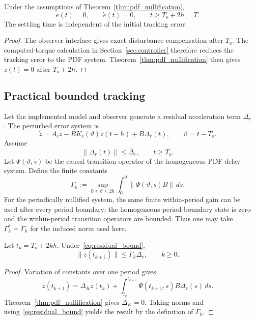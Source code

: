 \begin{theorem}\label{thm:main_ideal}
Under the assumptions of Theorem~\ref{thm:pdf_nullification},
\begin{equation}
 e(t)=0,\qquad \dot e(t)=0,
 \qquad t\geq T_o+2h=T.
\end{equation}
The settling time is independent of the initial tracking error.
\end{theorem}
\begin{proof}
The observer interface gives exact disturbance compensation after $T_o$.
The computed-torque calculation in Section~\ref{sec:controller} therefore
reduces the tracking error to the PDF system. Theorem~\ref{thm:pdf_nullification}
then gives $z(t)=0$ after $T_o+2h$.\end{proof}

\subsection{Practical bounded tracking}\label{sec:practical}
Let the implemented model and observer generate a residual acceleration
term $\Delta_r$. The perturbed error system is
\begin{equation}
 \dot z=A_cz-BK_c(\vartheta)z(t-h)+B\Delta_r(t),
 \qquad \vartheta=t-T_o.
 \label{eq:perturbed_delay_error}
\end{equation}
Assume
\begin{equation}
 \|\Delta_r(t)\|\leq\bar\Delta_r,
 \qquad t\geq T_o.
 \label{eq:residual_bound}
\end{equation}
Let $\Psi(\vartheta,s)$ be the causal transition operator of the homogeneous
PDF delay system. Define the finite constants
\begin{equation}
 \Gamma_h:=\sup_{0\leq\vartheta\leq2h}
 \int_0^\vartheta\|\Psi(\vartheta,s)B\|\,ds .
 \label{eq:gamma_definition}
\end{equation}
For the periodically nullified system, the same finite within-period gain can
be used after every period boundary: the homogeneous period-boundary state is
zero and the within-period transition operators are bounded. Thus one may take
$\Gamma_h^*=\Gamma_h$ for the induced norm used here.

\begin{theorem}\label{thm:practical_boundary}
Let $t_k=T_o+2kh$. Under~\eqref{eq:residual_bound},
\begin{equation}
 \|z(t_{k+1})\|\leq\Gamma_h\bar\Delta_r,
 \qquad k\geq0.
 \label{eq:pdf_boundary_bound}
\end{equation}
\end{theorem}
\begin{proof}
Variation of constants over one period gives
\[
z(t_{k+1})=\Delta_Kz(t_k)+
\int_{t_k}^{t_{k+1}}\Psi(t_{k+1},s)B\Delta_r(s)\,ds.
\]
Theorem~\ref{thm:pdf_nullification} gives $\Delta_K=0$. Taking norms and
using~\eqref{eq:residual_bound} yields the result by the definition of
$\Gamma_h$.\end{proof}

